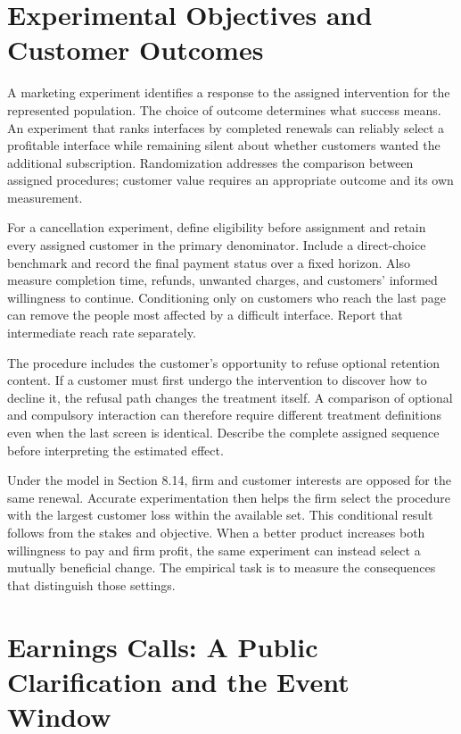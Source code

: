 \hypertarget{M06-experimental-objectives-and-customer-outcomes}{%
\section{Experimental Objectives and Customer
Outcomes}\label{M06-experimental-objectives-and-customer-outcomes}}

\noindent \noindent A marketing experiment identifies a response to the assigned
intervention for the represented population. The choice of outcome
determines what success means. An experiment that ranks interfaces by
completed renewals can reliably select a profitable interface while
remaining silent about whether customers wanted the additional
subscription. Randomization addresses the comparison between assigned
procedures; customer value requires an appropriate outcome and its own
measurement.

For a cancellation experiment, define eligibility before assignment and
retain every assigned customer in the primary denominator. Include a
direct-choice benchmark and record the final payment status over a fixed
horizon. Also measure completion time, refunds, unwanted charges, and
customers' informed willingness to continue. Conditioning only on
customers who reach the last page can remove the people most affected by
a difficult interface. Report that intermediate reach rate separately.

The procedure includes the customer's opportunity to refuse optional
retention content. If a customer must first undergo the intervention to
discover how to decline it, the refusal path changes the treatment
itself. A comparison of optional and compulsory interaction can
therefore require different treatment definitions even when the last
screen is identical. Describe the complete assigned sequence before
interpreting the estimated effect.

Under the model in Section 8.14, firm and customer interests are opposed
for the same renewal. Accurate experimentation then helps the firm
select the procedure with the largest customer loss within the available
set. This conditional result follows from the stakes and objective. When
a better product increases both willingness to pay and firm profit, the
same experiment can instead select a mutually beneficial change. The
empirical task is to measure the consequences that distinguish those
settings.

\hypertarget{M06-earnings-calls-a-public-clarification-and-the-event-window}{%
\section{Earnings Calls: A Public Clarification and the Event
Window}\label{M06-earnings-calls-a-public-clarification-and-the-event-window}}


